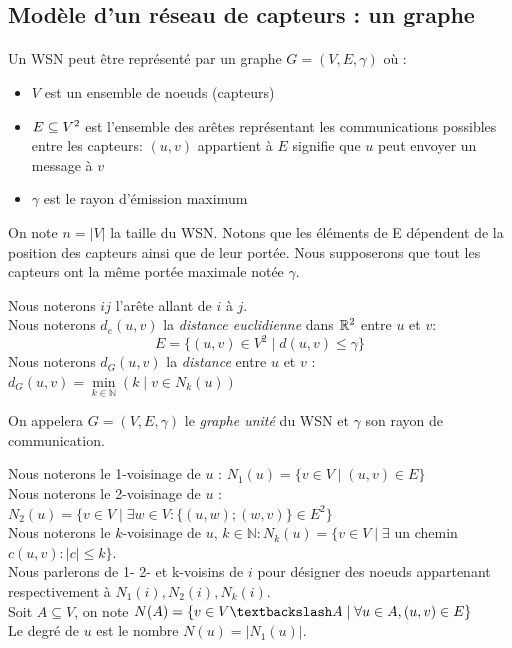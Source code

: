 \subsection{Modèle d'un réseau de capteurs : un graphe}

 \paragraph*{} Un WSN peut être représenté par un graphe $G= (V,E,\gamma)$ où :
 \begin{itemize}
 \item $V$ est un ensemble de noeuds (capteurs)
 \item $E \subseteq V \textsuperscript{2}$ est l'ensemble des arêtes représentant les communications possibles entre les capteurs: $(u,v)$ appartient à $E$ signifie que $u$ peut envoyer un  message à $v$
 \item $\gamma$ est le rayon d'émission maximum
 \end{itemize}
 
 On note $ n=|V| $ la taille du WSN. Notons que les éléments de E dépendent de la
 position des capteurs ainsi que de leur portée. Nous supposerons que tout les capteurs ont la même portée maximale notée $\gamma$. 


\begin{mydef}
Nous noterons $ij$ l'arête allant de $i$ à $j$. \\
Nous noterons $d_e(u,v)$ la \textit{distance euclidienne} dans $\mathbb{R} \textsuperscript{2}$ entre $u$ et $v$:
$$E = \{ (u,v) \in V ^{2} \mid d(u,v) \leq \gamma \}$$
Nous noterons $d_G(u,v)$ la \textit{distance} entre $ u $ et $ v $ : $d_G(u,v)= \min\limits_{k \in \mathbb{N}}(k \mid v \in N_k(u))$
\end{mydef}


\begin{mydef}
 On appelera $G= (V,E,\gamma)$ le \textit{graphe unité} du WSN et $\gamma$ son rayon de communication.
\end{mydef}



\begin{mydef}
Nous noterons le 1-voisinage de $u$ : $N_1(u) = \{ v \in V  \mid (u,v) \in E \}$ \\
Nous noterons le 2-voisinage de $u$ : $N_2(u) = \{ v \in V \mid  \exists w \in V :\{(u,w);(w,v)\} \in E ^2\}$ \\
Nous noterons le $k$-voisinage de $u$, $k \in \mathbb{N} : N_k(u) = \{ v \in V  \mid \exists $ un chemin $c (u,v): |c| \leq k\}$.\\
Nous parlerons de 1- 2- et k-voisins de $i$ pour désigner des noeuds appartenant respectivement
 à $N_1(i), N_2(i),N_k(i)$. \\
Soit $A \subseteq V$, on note $N(A) = \{ v \in V\textbackslash  A \mid \forall u\in A,(u,v) \in E \}$ \\
Le degré de $ u $ est le nombre  $N(u)=|N_1(u)|$.\\
\end{mydef}

